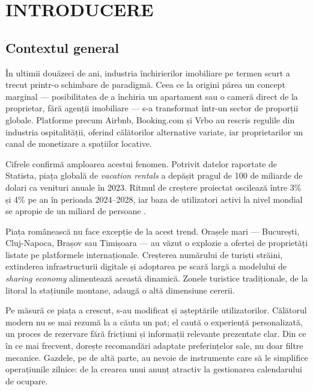 \documentclass[12pt,a4paper,oneside]{report}
\begin{document}


\tableofcontents
\newpage

\chapter{INTRODUCERE}

\section{Contextul general}

În ultimii douăzeci de ani, industria închirierilor imobiliare pe termen scurt a trecut printr-o schimbare de paradigmă. Ceea ce la origini părea un concept marginal — posibilitatea de a închiria un apartament sau o cameră direct de la proprietar, fără agenții imobiliare — s-a transformat într-un sector de proporții globale. Platforme precum Airbnb, Booking.com și Vrbo au rescris regulile din industria ospitalității, oferind călătorilor alternative variate, iar proprietarilor un canal de monetizare a spațiilor locative.

Cifrele confirmă amploarea acestui fenomen. Potrivit datelor raportate de Statista, piața globală de \textit{vacation rentals} a depășit pragul de 100 de miliarde de dolari ca venituri anuale în 2023. Ritmul de creștere proiectat oscilează între 3\% și 4\% pe an în perioada 2024--2028, iar baza de utilizatori activi la nivel mondial se apropie de un miliard de persoane \cite{statista2024}.

Piața românească nu face excepție de la acest trend. Orașele mari — București, Cluj-Napoca, Brașov sau Timișoara — au văzut o explozie a ofertei de proprietăți listate pe platformele internaționale. Creșterea numărului de turiști străini, extinderea infrastructurii digitale și adoptarea pe scară largă a modelului de \textit{sharing economy} alimentează această dinamică. Zonele turistice tradiționale, de la litoral la stațiunile montane, adaugă o altă dimensiune cererii.

Pe măsură ce piața a crescut, s-au modificat și așteptările utilizatorilor. Călătorul modern nu se mai rezumă la a căuta un pat; el caută o experiență personalizată, un proces de rezervare fără fricțiuni și informații relevante prezentate clar. Din ce în ce mai frecvent, dorește recomandări adaptate preferințelor sale, nu doar filtre mecanice. Gazdele, pe de altă parte, au nevoie de instrumente care să le simplifice operațiunile zilnice: de la crearea unui anunț atractiv la gestionarea calendarului de ocupare.
\end{document}
